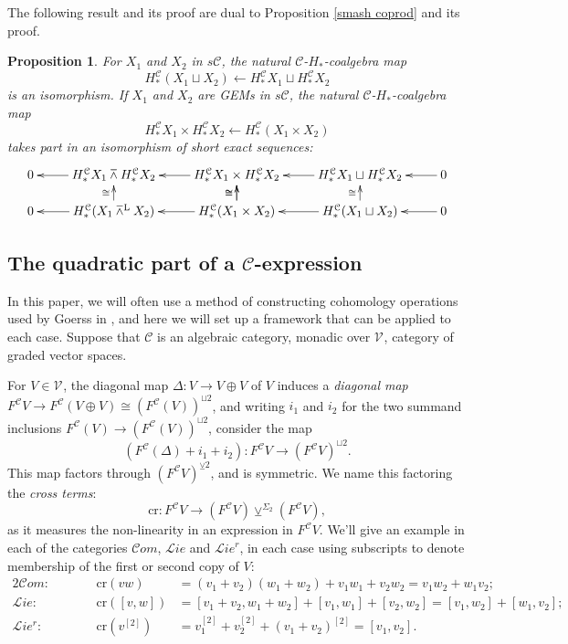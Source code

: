 \documentclass[11pt]{amsart} \renewcommand{\baselinestretch}{1.2}
\theoremstyle{plain}
\newtheorem{prop}[thm]{Proposition}
\theoremstyle{definition}
\renewcommand{\to}{\longrightarrow}
\newcommand{\from}{\longleftarrow}
\newcommand{\scrL}{\mathscr{L}}
\newcommand{\scrC}{\mathscr{C}}
\newcommand{\calV}{\mathcal{V}}
\newcommand{\calc}{\mathcal{C}}
\newcommand{\citeBOX}[2][]{\cite[\mbox{#1}]{#2}}
\newcommand{\restn}[1]{#1^{[2]}}
\newcommand{\vect}[2]{\calV^{#1}_{#2}}
\newcommand{\crossterms}{\mathrm{cr}}
\newcommand{\algs}{{\scrC\!\textit{om}}}
\newcommand{\liealgs}{{\scrL\!\textit{ie}}}
\newcommand{\restliealgs}{{\scrL\!\textit{ie}^\textit{r}}}
\newcommand{\smashprod}{\barwedge}%
\newcommand{\Lsmashprod}{\barwedge^\mathrm{L}}%
\newcommand{\smashcoprod}{\veebar}%
\begin{document}
\begin{Pi-algebras and cohomology algebras}
The following result and its proof are dual to Proposition \ref{smash coprod} and its proof.
\begin{prop}
\label{smash prod}
For $X_1$ and $X_2$ in $s\calc$, the natural $\calc$-$H_*$-coalgebra map
\[H^\calc_*(X_1\sqcup X_2)\from H^\calc_* X_1\sqcup H^\calc_* X_2\]
 is an isomorphism. If $X_1$ and $X_2$ are GEMs in $s\calc$, the natural $\calc$-$H_*$-coalgebra map 
\[H^\calc_* X_1\times H^\calc_* X_2\from H^\calc_*(X_1\times X_2)\]
takes part in an isomorphism of short exact sequences:
\[\xymatrix@R=4mm{
0\ar[r];[]&%
H^\calc_* X_1\smashprod H^\calc_* X_2
\ar[r];[]\ar[d];[]^-{\cong}
&%
H^\calc_* X_1\times H^\calc_* X_2
\ar[r];[]
\ar[d];[]^-{\cong}\ar[d];[]^-{\cong}
&%
H^\calc_* X_1\sqcup H^\calc_* X_2
\ar[r];[]
\ar[d];[]^-{\cong}
&%
0\\%
0\ar[r];[]&%
H^\calc_* (X_1\Lsmashprod X_2)
\ar[r];[]
&%
H^\calc_* (X_1\times X_2)
\ar[r];[]
&%
H^\calc_* (X_1\sqcup X_2)
\ar[r];[]&0
}\]
\end{prop}





\subsection{The quadratic part of a $\calc$-expression}\label{quadratic part section}
In this paper, we will often use a method of constructing cohomology operations used by Goerss in \citeBOX[\S5]{MR1089001}, and here we will set up a framework that can be applied to each case. Suppose that $\calc$ is an algebraic category, monadic over $\vect{}{}$, category of graded vector spaces. 



For $V\in\vect{}{}$, the diagonal map $\Delta:V\to V\oplus V$ of $V$ induces a \emph{diagonal map} $F^\calc V\to F^\calc (V\oplus V)\cong (F^\calc (V))^{\sqcup 2}$, and writing $i_1$ and $i_2$ for the two summand inclusions $F^\calc (V)\to (F^\calc (V))^{\sqcup 2}$, consider the map
\[(F^\calc(\Delta)+i_1+i_2):F^\calc V\to (F^\calc V)^{\sqcup2}.\]
This map  factors through $(F^\calc V)^{\smashcoprod 2}$, and is symmetric. We name this factoring the \emph{cross terms}:
\[\crossterms:F^\calc V\to (F^\calc V)\smashcoprod^{\Sigma_2} (F^\calc V),\]
as it measures the non-linearity in an expression in $F^\calc V$.  We'll give an example in each of the categories $\algs$, $\liealgs$ and $\restliealgs$, in each case using subscripts to denote membership of the first or second copy of $V$:
\begin{alignat*}{2}
\algs:&\qquad&\crossterms(vw)&=(v_1+v_2)(w_1+w_2)+v_1w_1+v_2w_2=v_1w_2+w_1v_2;\\
\liealgs:&\qquad&\crossterms([v,w])&= [v_1+v_2,w_1+w_2]+[v_1,w_1]+[v_2,w_2]=[v_1,w_2]+[w_1,v_2];\\
\restliealgs:&\qquad&\crossterms(\restn{v})&= \restn{v_1}+\restn{v_2}+\restn{(v_1+v_2)}=[v_1,v_2].
\end{alignat*}



\end{Pi-algebras and cohomology algebras}
\end{document}
